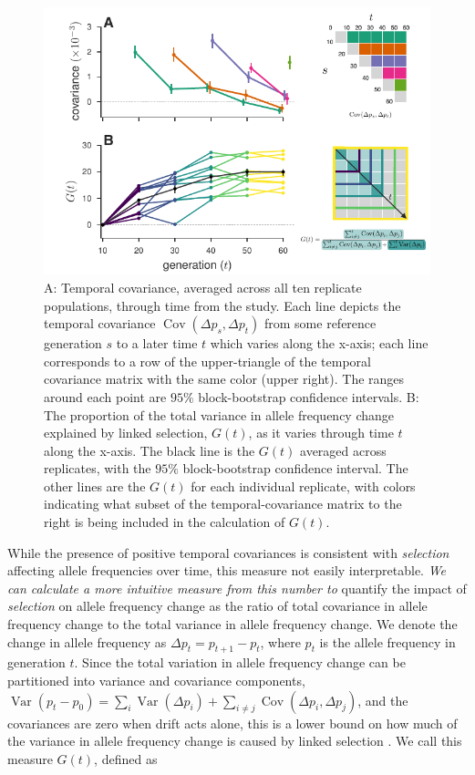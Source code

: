 \documentclass[11pt]{article}
\newcommand{\gc}[1]{{\it \color{red} #1 } }
\DeclareMathOperator{\var}{Var}
\DeclareMathOperator{\cov}{Cov}
\begin{document}
\begin{figure}[!htb]
  \centering
  \includegraphics[width=\textwidth]{figures/figure-1.pdf}

  \caption{A: Temporal covariance, averaged across all ten replicate
    populations, through time from the \textcite{Barghi2019-qy} study. Each
    line depicts the temporal covariance $\cov(\Delta p_s, \Delta p_t)$ from
    some reference generation $s$ to a later time $t$ which varies along the
    x-axis; each line corresponds to a row of the upper-triangle of the
    temporal covariance matrix with the same color (upper right). The ranges
    around each point are $95\%$ block-bootstrap confidence intervals. B: The
    proportion of the total variance in allele frequency change explained by
    linked selection, $G(t)$, as it varies through time $t$ along the x-axis.
    The black line is the $G(t)$ averaged across replicates, with the $95\%$
    block-bootstrap confidence interval. The other lines are the $G(t)$ for
    each individual replicate, with colors indicating what subset of the
    temporal-covariance matrix to the right is being included in the
  calculation of $G(t)$.}

  \label{fig:figure-1}
\end{figure}

While the presence of positive temporal covariances is consistent with 
\gc{selection} affecting allele frequencies over time, this measure not easily
interpretable. \gc{We can calculate a more intuitive measure from this
number to} quantify the impact of \gc{selection} on
allele frequency change as the ratio of total covariance in allele frequency
change to the total variance in allele frequency change. We denote the
change in allele frequency as $\Delta p_t = p_{t+1}-p_t$, where $p_t$ is the
allele frequency in generation $t$. Since the total variation in allele
frequency change can be partitioned into variance and covariance components,
$\var(p_t - p_0) = \sum_{i} \var(\Delta p_i) + \sum_{i \ne j} \cov(\Delta
p_i, \Delta p_j)$, and the covariances are zero when drift acts alone, this is
a lower bound on how much of the variance in allele frequency change is caused
by linked selection \parencite{Buffalo2019-io}. We call this measure $G(t)$, defined as
\end{document}
